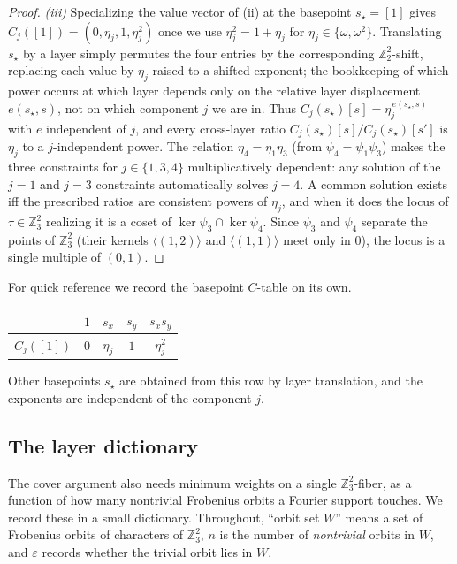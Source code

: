 \documentclass[11pt]{article}
\newcommand{\Z}{\mathbb{Z}}
\newcommand{\aug}{\varepsilon}
\newcommand{\sx}{s_x}
\newcommand{\sy}{s_y}
\theoremstyle{plain}
\theoremstyle{definition}
\theoremstyle{remark}
\begin{document}
\begin{proof}
\emph{(iii)} Specializing the value vector of (ii) at the basepoint $s_\star=[1]$
gives $C_j([1])=(0,\eta_j,1,\eta_j^2)$ once we use $\eta_j^2=1+\eta_j$ for
$\eta_j\in\{\omega,\omega^2\}$. Translating $s_\star$ by a layer simply permutes
the four entries by the corresponding $\Z_2^2$-shift, replacing each value by
$\eta_j$ raised to a shifted exponent; the bookkeeping of which power occurs at
which layer depends only on the relative layer displacement $e(s_\star,s)$, not on
which component $j$ we are in. Thus $C_j(s_\star)[s]=\eta_j^{\,e(s_\star,s)}$ with
$e$ independent of $j$, and every cross-layer ratio
$C_j(s_\star)[s]/C_j(s_\star)[s']$ is $\eta_j$ to a $j$-independent power. The
relation $\eta_4=\eta_1\eta_3$ (from $\psi_4=\psi_1\psi_3$) makes the three
constraints for $j\in\{1,3,4\}$ multiplicatively dependent: any solution of the
$j=1$ and $j=3$ constraints automatically solves $j=4$. A common solution exists
iff the prescribed ratios are consistent powers of $\eta_j$, and when it does the
locus of $\tau\in\Z_3^2$ realizing it is a coset of $\ker\psi_3\cap\ker\psi_4$.
Since $\psi_3$ and $\psi_4$ separate the points of $\Z_3^2$ (their kernels
$\langle(1,2)\rangle$ and $\langle(1,1)\rangle$ meet only in $0$), the locus is a
single multiple of $(0,1)$.
\end{proof}

For quick reference we record the basepoint $C$-table on its own.

\begin{center}
\begin{tabular}{lcccc}
\toprule
 & $1$ & $\sx$ & $\sy$ & $\sx\sy$ \\
\midrule
$C_j([1])$ & $0$ & $\eta_j$ & $1$ & $\eta_j^2$ \\
\bottomrule
\end{tabular}
\end{center}

\noindent
Other basepoints $s_\star$ are obtained from this row by layer translation, and
the exponents are independent of the component $j$.

\subsection{The layer dictionary}

The cover argument also needs minimum weights on a single $\Z_3^2$-fiber, as a
function of how many nontrivial Frobenius orbits a Fourier support touches. We
record these in a small dictionary. Throughout, ``orbit set $W$'' means a set of
Frobenius orbits of characters of $\Z_3^2$, $n$ is the number of \emph{nontrivial}
orbits in $W$, and $\aug$ records whether the trivial orbit lies in $W$.
\end{document}
